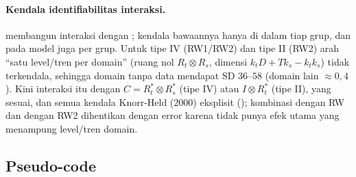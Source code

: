\paragraph{Kendala identifiabilitas interaksi.}  membangun interaksi dengan
; kendala bawaannya hanya di dalam tiap grup, dan  pada model
 juga per grup. Untuk tipe IV (RW1/RW2) dan tipe II (RW2) arah ``satu level/tren per
domain'' (ruang nol $R_t\otimes R_s$, dimensi $k_tD + Tk_s - k_tk_s$) tidak terkendala, sehingga
domain tanpa data mendapat SD $36$--$58$ (domain lain $\approx0{,}4$). Kini interaksi itu
 dengan $C = R_t^\ast\otimes R_s^\ast$ (tipe IV) atau $I\otimes R_t^\ast$ (tipe II),
 yang sesuai, dan semua kendala Knorr-Held (2000) eksplisit
(); kombinasi  dengan RW dan  dengan
RW2 dihentikan dengan error karena tidak punya efek utama yang menampung level/tren domain.

\subsection{Pseudo-code}\label{sec:hbarea-algo}

